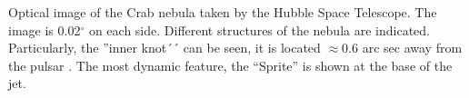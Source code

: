 \label{fig:knot}
Optical image of the Crab nebula taken by the Hubble Space Telescope. The image is 0.02$^\circ$ on each side. Different structures of the nebula are indicated. Particularly, the ''inner knot´´ can be seen, it is located $\approx 0.6$ arc sec away from the pulsar \cite{rudy2015}.  The most dynamic feature, the ``Sprite'' \citep[e.g.][]{hester2002} is shown at the base of the jet.  
